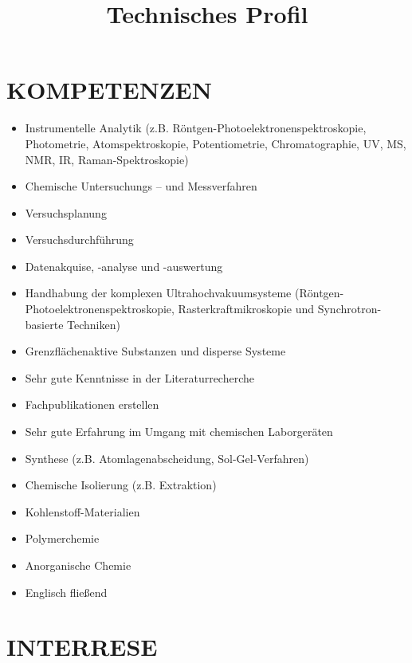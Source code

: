 \documentclass[11pt,a4paper,sans]{moderncv} %
\title{Technisches Profil}
\begin{document}


\makecvtitle %


\section{KOMPETENZEN}


\cvitem{}
{
\begin{itemize}
	\item Instrumentelle Analytik (z.B. Röntgen-Photoelektronenspektroskopie, Photometrie, Atomspektroskopie, Potentiometrie, Chromatographie, UV, MS, NMR, IR, Raman-Spektroskopie)
	\item Chemische Untersuchungs – und Messverfahren 
	\item Versuchsplanung 
	\item Versuchsdurchführung  
	\item Datenakquise, -analyse und -auswertung
	\item Handhabung der komplexen Ultrahochvakuumsysteme (Röntgen-Photoelektronenspektroskopie, Rasterkraftmikroskopie und Synchrotron-basierte Techniken)
  \item Grenzflächenaktive Substanzen und disperse Systeme
	\item Sehr gute Kenntnisse in der Literaturrecherche
	\item Fachpublikationen erstellen 
	\item Sehr gute Erfahrung im Umgang mit chemischen Laborgeräten 
	\item Synthese (z.B. Atomlagenabscheidung, Sol-Gel-Verfahren)
	\item Chemische Isolierung (z.B. Extraktion)
	\item Kohlenstoff-Materialien
	\item Polymerchemie
	\item Anorganische Chemie 
	\item Englisch fließend 
\end{itemize}
}

\section{INTERRESE}
\end{document}
